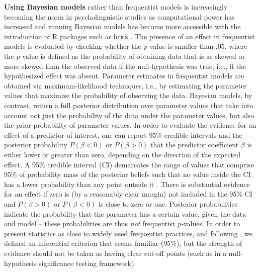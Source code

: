 \documentclass[11pt,fleqn]{article}
\newcommand{\6}{\mbox{$[\hspace*{-.6mm}[$}}
\newcommand{\9}{\mbox{$]\hspace*{-.6mm}]$}}
\begin{document}
{\textbf{Using Bayesian models} rather than frequentist models is increasingly becoming the norm in psycholinguistic studies as computational power has increased and running Bayesian models has become more accessible with the introduction of R packages such as \verb|brms| \citep{buerkner2017}. The presence of an effect in frequentist models is evaluated by checking whether the {\em p-}value is smaller than $.05$, where the {\em p-}value is defined as the probability of obtaining data that is as skewed or more skewed than the observed data if the null-hypothesis was true, i.e., if the hypothesized effect was absent. Parameter estimates in frequentist models are obtained via maximum-likelihood techniques, i.e., by estimating the parameter values that maximize the probability of observing the data. Bayesian models, by contrast, return a full posterior distribution over parameter values that take into account not just the probability of the data under the parameter values, but also the prior probability of parameter values. In order to evaluate the evidence for an effect of a predictor of interest, one can report 95\% credible intervals and the posterior probability $P(\beta < 0)$ or $P(\beta > 0)$ that the predictor coefficient $\beta$ is either lower or greater than zero, depending on the direction of the expected effect. A 95\% credible interval (CI) demarcates the range of values that comprise 95\% of probability mass of the posterior beliefs such that no value inside the CI has a lower probability than any point outside it \citep{Jaynes1976, Morey2016}. There is substantial evidence for an effect if zero is (by a reasonably clear margin) not included in the 95\% CI and $P(\beta > 0)$ or $P(\beta < 0)$ is close to zero or one. Posterior probabilities indicate the probability that the parameter has a certain value, given the data and model -- these probabilities are thus \emph{not} frequentist {\em p-}values. In order to present statistics as close to widely used frequentist practices, and following \citealt{Nicenboim2016}, we defined an inferential criterion that seems familiar (95\%), but the strength of evidence should not be taken as having clear cut-off points (such as in a null-hypothesis significance testing framework).

}
\end{document}
